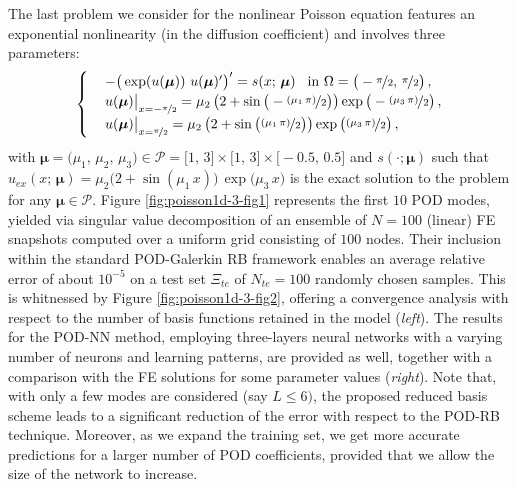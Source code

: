 \documentclass[12pt, a4paper, twoside, openright]{report}
\numberwithin{equation}{chapter}
\theoremstyle{theorem}
\theoremstyle{definition}
\theoremstyle{remark}
\theoremstyle{proposition}
\numberwithin{figure}{chapter}
\newcommand{\bg}[1]{\boldsymbol{#1}}
\begin{document}
		The last problem we consider for the nonlinear Poisson equation features an exponential nonlinearity (in the diffusion coefficient) and involves three parameters:
		\begin{equation}
			\label{eq:poisson1d-3}
			\begin{cases}
				& - \big( \exp(u(\bg{\mu})) ~ u(\bg{\mu})' \big)' = s(x; \, \bg{\mu}) \hspace*{0.3cm} \text{in $\Omega = \big( -\nicefrac{\pi}{2}, \, \nicefrac{\pi}{2} \big)$} \, , \\
				& u(\bg{\mu}) \big|_{x = -\nicefrac{\pi}{2}} = \mu_2 \left( 2 + \sin\big( - \nicefrac{(\mu_1 \, \pi)}{2} \big) \right) \exp \big( - \nicefrac{(\mu_3 \, \pi)}{2} \big) \, , \\
				& u(\bg{\mu}) \big|_{x = \nicefrac{\pi}{2}} = \mu_2 \left( 2 + \sin\big( \nicefrac{(\mu_1 \, \pi)}{2} \big) \right) \exp \big( \nicefrac{(\mu_3 \, \pi)}{2} \big) \, ,
			\end{cases}
		\end{equation}
		with $\bg{\mu} = \big(\mu_1, \, \mu_2, \, \mu_3 \big) \in \mathcal{P} = \big[ 1, \, 3 \big] \times \big[ 1, \, 3 \big] \times \big[ -0.5, \, 0.5 \big]$ and $s(\cdot; \bg{\mu})$ such that $u_{ex}(x; \, \bg{\mu}) = \mu_2 \big( 2 + \sin(\mu_1 \, x) \big) \, \exp \big( \mu_3 \, x \big)$ is the exact solution to the problem for any $\bg{\mu} \in \mathcal{P}$. Figure \ref{fig:poisson1d-3-fig1} represents the first $10$ POD modes, yielded via singular value decomposition of an ensemble of $N = 100$ (linear) FE snapshots computed over a uniform grid consisting of $100$ nodes. Their inclusion within the standard POD-Galerkin RB framework enables an average relative error of about $10^{-5}$ on a test set $\Xi_{te}$ of $N_{te} = 100$ randomly chosen samples. This is whitnessed by Figure \ref{fig:poisson1d-3-fig2}, offering a convergence analysis with respect to the number of basis functions retained in the model (\emph{left}). The results for the POD-NN method, employing three-layers neural networks with a varying number of neurons and learning patterns, are provided as well, together with a comparison with the FE solutions for some parameter values (\emph{right}). Note that, with only a few modes are considered (say $L \leq 6)$, the proposed reduced basis scheme leads to a significant reduction of the error with respect to the POD-RB technique. Moreover, as we expand the training set, we get more accurate predictions for a larger number of POD coefficients, provided that we allow the size of the network to increase. 
		
\end{document}
